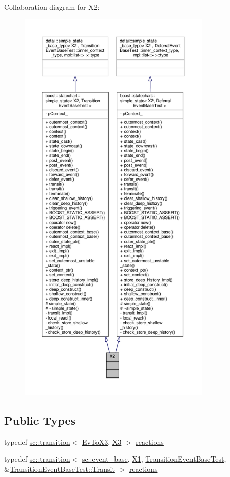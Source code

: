 Collaboration diagram for X2\+:
\nopagebreak
\begin{figure}[H]
\begin{center}
\leavevmode
\includegraphics[height=550pt]{struct_x2__coll__graph}
\end{center}
\end{figure}
\subsection*{Public Types}
\begin{DoxyCompactItemize}
\item 
typedef \mbox{\hyperlink{classboost_1_1statechart_1_1transition}{sc\+::transition}}$<$ \mbox{\hyperlink{struct_ev_to_x3}{Ev\+To\+X3}}, \mbox{\hyperlink{struct_x3}{X3}} $>$ \mbox{\hyperlink{struct_x2_a25cbaeb930abe68200d4d1d9e4058010}{reactions}}
\item 
typedef \mbox{\hyperlink{classboost_1_1statechart_1_1transition}{sc\+::transition}}$<$ \mbox{\hyperlink{classboost_1_1statechart_1_1event__base}{sc\+::event\+\_\+base}}, \mbox{\hyperlink{struct_x1}{X1}}, \mbox{\hyperlink{struct_transition_event_base_test}{Transition\+Event\+Base\+Test}}, \&\mbox{\hyperlink{struct_transition_event_base_test_a51e7226f3256cceaf604f958287bcd8b}{Transition\+Event\+Base\+Test\+::\+Transit}} $>$ \mbox{\hyperlink{struct_x2_a2bce7135945b353eb8e986bebec318ee}{reactions}}
\end{DoxyCompactItemize}
